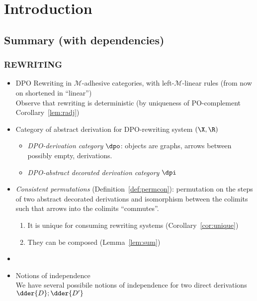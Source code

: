 \chapter{Introduction}

\section*{Summary (with dependencies)}

\subsection*{REWRITING}
\begin{itemize}
	\item DPO Rewriting in $\mathcal{M}$-adhesive categories, with left-$\mathcal{M}$-linear rules (from now on shortened in ``linear'')\\
	Observe that rewriting is deterministic (by uniqueness of
	PO-complement Corollary~\ref{lem:radj})
	
	\item Category of abstract derivation for DPO-rewriting system $(\X, \R)$
	\begin{itemize}
		\item \emph{DPO-derivation category} $\dpo$: objects are graphs, arrows between possibly empty, derivations.
		\item \emph{DPO-abstract decorated derivation category} $\dpi$
	\end{itemize}
	
	
	
	\item \emph{Consistent permutations} (Definition~\ref{def:permcon}):
	permutation on the steps of two abstract decorated derivations and isomorphism between the colimits such
	that arrows into the colimits ``commutes''.
	\begin{enumerate}
		\item It is unique for consuming rewriting systems
		(Corollary~\ref{cor:unique})
		\item They can be composed (Lemma~\ref{lem:sum})
	\end{enumerate}
	\item 
	
	
	\item Notions of independence\\
	We have several possibile notions of independence for two direct
	derivations $\dder{D} ; \dder{D'}$
	\begin{enumerate}
		

\end{enumerate}
\end{itemize}
